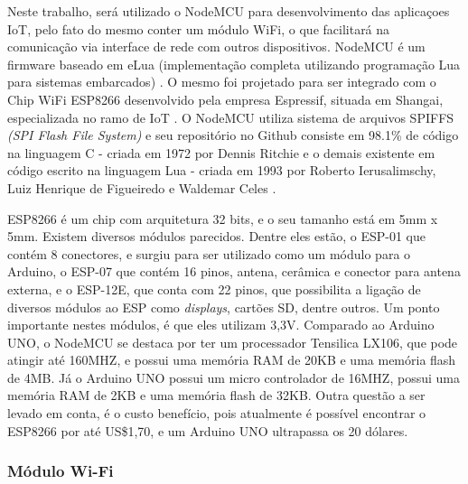 \documentclass[journal]{IEEEtran}
\begin{document}
Neste trabalho, será utilizado o NodeMCU para desenvolvimento das aplicaçoes IoT, pelo fato do mesmo conter um módulo WiFi, o que facilitará na comunicação via interface de rede com outros dispositivos. NodeMCU é um firmware baseado em eLua (implementação completa utilizando programação Lua para sistemas embarcados) \cite{elua2017}. O mesmo foi projetado para ser integrado com o Chip WiFi ESP8266 desenvolvido pela empresa Espressif, situada em Shangai, especializada no ramo de IoT \cite{systems}. O NodeMCU utiliza sistema de arquivos SPIFFS \emph{(SPI Flash File System)} e seu repositório no Github consiste em 98.1\% de código na linguagem C - criada em 1972 por Dennis Ritchie \cite{williamstewart2017} e o demais existente em código escrito na linguagem Lua  - criada em 1993 por Roberto Ierusalimschy, Luiz Henrique de Figueiredo e Waldemar Celes \cite{lua2017Authors}.

ESP8266 é um chip com arquitetura 32 bits, e o seu tamanho está em 5mm x 5mm. Existem diversos módulos parecidos. Dentre eles estão, o ESP-01 que contém 8 conectores, e surgiu para ser utilizado como um módulo para o Arduino, o ESP-07 que contém 16 pinos, antena, cerâmica e conector para antena externa, e o ESP-12E, que conta com 22 pinos, que possibilita a ligação de diversos módulos ao ESP como \emph{displays}, cartões SD, dentre outros. Um ponto importante nestes módulos, é que eles utilizam 3,3V. Comparado ao Arduino UNO, o NodeMCU se destaca por ter um processador Tensilica LX106, que pode atingir até 160MHZ, e possui uma memória RAM de 20KB e uma memória flash de 4MB. Já o Arduino UNO possui um micro controlador de 16MHZ, possui uma memória RAM de 2KB e uma memória flash de 32KB. Outra questão a ser levado em conta, é o custo benefício, pois atualmente é possível encontrar o ESP8266 por até US\$1,70, e um Arduino UNO ultrapassa os 20 dólares\cite{IrvingNodeMCU}.


\subsubsection{Módulo Wi-Fi}
\end{document}
